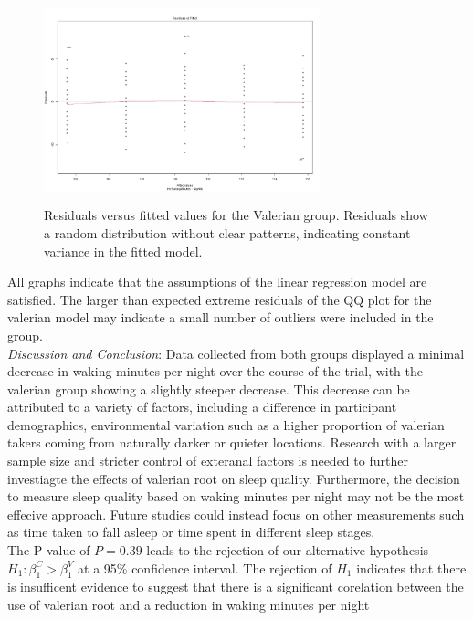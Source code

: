\documentclass[10pt,preprintnumbers,amsmath,amssymb,floatfix,twocolumn,prl]{revtex4-2}
\begin{document}
\begin{figure}
\centering
\includegraphics[width = 8cm, height = 6cm]{residual_fitted_valerian.png}
\caption{Residuals versus fitted values for the Valerian group. Residuals show a random distribution without clear patterns, indicating constant variance in the fitted model.}
\end{figure}

All graphs indicate that the assumptions of the linear regression model are satisfied. The larger than expected extreme residuals of the QQ plot for the valerian model may indicate a small number of outliers were included in the group. \\

\textit{Discussion and Conclusion}: Data collected from both groups displayed a minimal decrease in waking minutes per night over the course of the trial, with the valerian group showing a slightly steeper decrease. This decrease can be attributed to a variety of factors, including a difference in participant demographics, environmental variation such as a higher proportion of valerian takers coming from naturally darker or quieter locations. 
Research with a larger sample size and stricter control of exteranal factors is needed to further investiagte the effects of valerian root on sleep quality. Furthermore, the decision to measure sleep quality based on waking minutes per night may not be the most effecive approach. Future studies could instead focus on other measurements such as time taken to fall asleep or time spent in different sleep stages.\\
The P-value of $P = 0.39$ leads to the rejection of our alternative hypothesis $H_1: \beta_1^C > \beta_1^V$ at a 95\% confidence interval. The rejection of $H_1$ indicates that there is insufficent evidence to suggest that there is a significant corelation between the use of valerian root and a reduction in waking minutes per night




\end{document}
